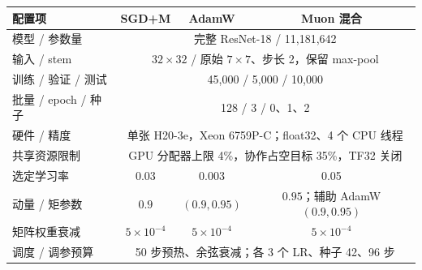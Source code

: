 \begin{tabular}{lccc}\toprule
配置项 & SGD+M & AdamW & Muon 混合 \\ \midrule
模型 / 参数量 & \multicolumn{3}{c}{完整 ResNet-18 / 11,181,642} \\
输入 / stem & \multicolumn{3}{c}{$32\times32$ / 原始 $7\times7$、步长 2，保留 max-pool} \\
训练 / 验证 / 测试 & \multicolumn{3}{c}{45,000 / 5,000 / 10,000} \\
批量 / epoch / 种子 & \multicolumn{3}{c}{128 / 3 / 0、1、2} \\
硬件 / 精度 & \multicolumn{3}{c}{单张 H20-3e，Xeon 6759P-C；float32、4 个 CPU 线程} \\
共享资源限制 & \multicolumn{3}{c}{GPU 分配器上限 4\%，协作占空目标 35\%，TF32 关闭} \\
选定学习率 & 0.03 & 0.003 & 0.05 \\
动量 / 矩参数 & $0.9$ & $(0.9,0.95)$ & $0.95$；辅助 AdamW $(0.9,0.95)$ \\
矩阵权重衰减 & $5\times10^{-4}$ & $5\times10^{-4}$ & $5\times10^{-4}$ \\
调度 / 调参预算 & \multicolumn{3}{c}{50 步预热、余弦衰减；各 3 个 LR、种子 42、96 步} \\
\bottomrule\end{tabular}
